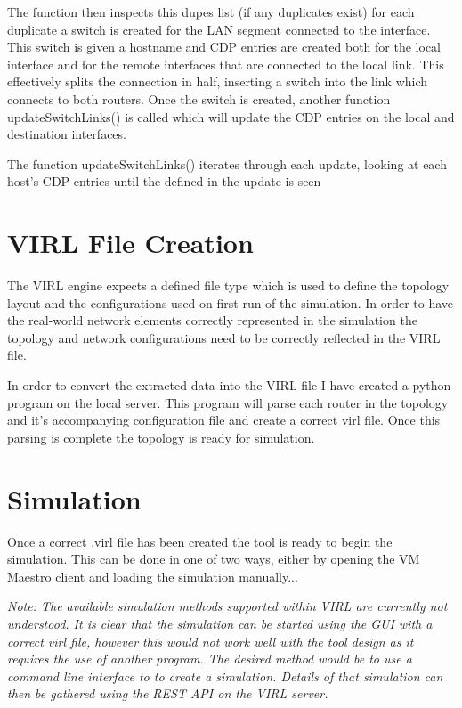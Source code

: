 \documentclass[11pt]{report}
\begin{document}
The function then inspects this dupes list (if any duplicates exist) for each duplicate a switch is created for the LAN segment connected to the interface. This switch is given a hostname and CDP entries are created both for the local interface and for the remote interfaces that are connected to the local link. This effectively splits the connection in half, inserting a switch into the link which connects to both routers. Once the switch is created, another function updateSwitchLinks() is called which will update the CDP entries on the local and destination interfaces.

The function updateSwitchLinks() iterates through each update, looking at each host's CDP entries until the defined in the update is seen

\section{VIRL File Creation}

The VIRL engine expects a defined file type which is used to define the topology layout and the configurations used on first run of the simulation. In order to have the real-world network elements correctly represented in the simulation the topology and network configurations need to be correctly reflected in the VIRL file. 

In order to convert the extracted data into the VIRL file I have created a python program on the local server. This program will parse each router in the topology and it's accompanying configuration file and create a correct virl file. Once this parsing is complete the topology is ready for simulation.

\section{Simulation}

Once a correct .virl file has been created the tool is ready to begin the simulation. This can be done in one of two ways, either by opening the VM Maestro client and loading the simulation manually...

\textit{Note: The available simulation methods supported within VIRL are currently not understood. It is clear that the simulation can be started using the GUI with a correct virl file, however this would not work well with the tool design as it requires the use of another program. The desired method would be to use a command line interface to to create a simulation. Details of that simulation can then be gathered using the REST API on the VIRL server.}
\end{document}
